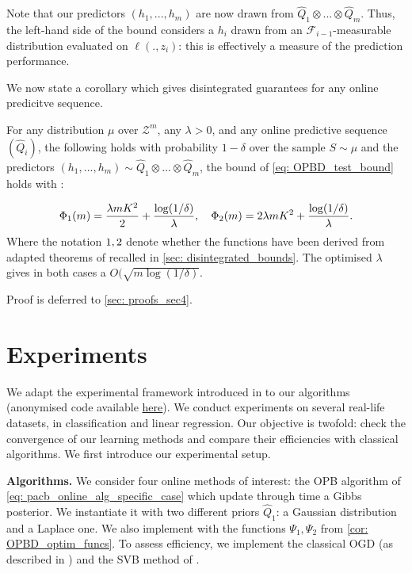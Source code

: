 Note that our predictors $(h_1,...,h_m)$ are now drawn from $\hat{Q}_1\otimes...\otimes \hat{Q}_{m}$. Thus, the left-hand side of the bound considers a $h_i$ drawn from an $\mathcal{F}_{i-1}$-measurable distribution evaluated on $\ell(.,z_i)$: this is effectively a measure of the prediction performance.

We now state a corollary which gives disintegrated guarantees for any online predicitve sequence.

\begin{corollary}
  \label{cor: OPBD_test_bound}
  For any distribution $\mu$ over $\mathcal{Z}^m$, any $\lambda>0$, and any online predictive sequence $(\hat{Q}_i)$, the following holds with probability $1-\delta$ over the sample $S\sim \mu$ and the predictors $(h_1,...,h_m)\sim \hat{Q}_1\otimes...\otimes \hat{Q}_m$, the bound of \cref{eq: OPBD_test_bound} holds with  :

  \begin{align*}
    \Phi_{\normalfont1}(m)= \frac{\lambda m K^2}{2} + \frac{\log(1/\delta)}{\lambda}, \quad \Phi_{\normalfont2}(m) = 2\lambda m K^2 + \frac{\log(1/\delta)}{\lambda}.
  \end{align*}
  Where the notation $\normalfont1, \normalfont2$ denote whether the functions have been derived from adapted theorems of \citealp{rivasplata2020pac,viallard2023general} recalled in \cref{sec: disintegrated_bounds}. The optimised $\lambda$ gives in both cases a $O(\sqrt{m\log(1/\delta)}$.
\end{corollary}

 Proof is deferred to \cref{sec: proofs_sec4}.

\section{Experiments}
\label{sec: experiments}

We adapt the experimental framework introduced in \citet[Sec.5]{cherief2019generalization} to our algorithms (anonymised code available \href{https://anonymous.4open.science/r/Online-PAC-Bayes-learning-044F}{here}). We conduct experiments on several real-life datasets, in classification and
linear regression. Our objective is twofold: check the convergence of our learning methods and compare their efficiencies with classical algorithms. We first introduce our experimental setup.

\textbf{Algorithms.}
We consider four online methods of interest: the OPB algorithm of \cref{eq: pacb_online_alg_specific_case} which update through time a Gibbs posterior. We instantiate it with two different priors $\hat{Q}_1$: a Gaussian distribution and a Laplace one. We also implement  with the functions $\Psi_1,\Psi_2$ from \cref{cor: OPBD_optim_funcs}.
To assess efficiency, we implement the classical OGD (as described in \citealp[Alg. 1 of][]{zinkevich2003online}) and the SVB method of \citet{cherief2019generalization}.

